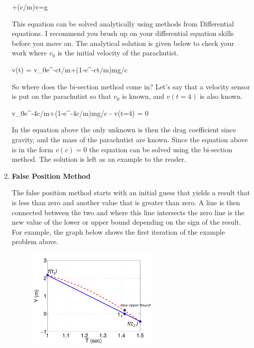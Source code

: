 \begin{enumerate}
  \beq
  +(c/m)v=g
  \eeq

  This equation can be solved analytically using methods from
  Differential equations. I recommend you brush up on your
  differential equation skills before you move on. The analytical
  solution is given below to check your work where $v_0$ is the
  initial velocity of the parachutist.

  \beq
  v(t) = v_0e^{-ct/m}+(1-e^{-ct/m})mg/c
  \eeq

  So where does the bi-section method come in? Let's say that a
  velocity sensor is put on the parachutist so that $v_0$ is known,
  and $v(t=4)$ is also known. 

  \beq
  v_0e^{-4c/m}+(1-e^{-4c/m})mg/c - v(t=4) = 0
  \eeq
  
  In the equation above the only unknown is then the drag coefficient
  since gravity, and the mass of the parachutist are known. Since the
  equation above is in the form $v(c)=0$ the equation can be solved
  using the bi-section method. The solution is left as an example to
  the reader.

\item {\bf False Position Method}

The false position method starts with an initial guess that yields a
result that is less than zero and another value that is greater
than zero. A line is then connected between the two and where this
line intersects the zero line is the new value of the lower or upper
bound depending on the sign of the result. For example, the graph
below shows the first iteration of the example problem above.

\begin{figure}[htb]
  \begin{center}
    \includegraphics[height=0.45\textwidth,width=0.6\textwidth]{Graphics/False_Position.pdf}
  \end{center}
\end{figure}


\end{enumerate}
